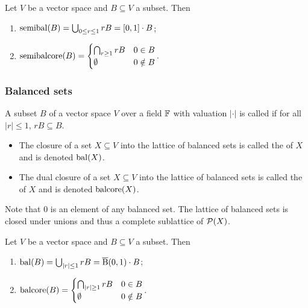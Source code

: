 \begin{lemma}
Let $V$ be a vector space and $B\subseteq V$ a subset. Then
\begin{enumerate}
\item $\semibalanced(B) = \bigcup_{0\leq r\leq 1}rB = \interval{0,1}\cdot B$;
\item $\operatorname{semibalcore}(B) = \begin{cases}
\bigcap_{r\geq 1}rB & 0\in B\\
\emptyset & 0\notin B
\end{cases}$.
\end{enumerate}
\end{lemma}

\subsubsection{Balanced sets}
\begin{definition}
A subset $B$ of a vector space $V$ over a field $\mathbb{F}$ with valuation $|\cdot|$ is called  if for all $|r|\leq 1$, $rB \subseteq B$.

\begin{itemize}
\item The closure of a set $X\subseteq V$ into the lattice of balanced sets is called the  of $X$ and is denoted $\operatorname{bal}(X)$.
\item The dual closure of a set $X\subseteq V$ into the lattice of balanced sets is called the  of $X$ and is denoted $\operatorname{balcore}(X)$.
\end{itemize}
\end{definition}
Note that $0$ is an element of any balanced set. The lattice of balanced sets is closed under unions and thus a complete sublattice of $\operatorname{\mathcal{P}}(X)$.

\begin{lemma}
Let $V$ be a vector space and $B\subseteq V$ a subset. Then
\begin{enumerate}
\item $\operatorname{bal}(B) = \bigcup_{|r|\leq 1}rB = \operatorname{\overline{B}}(0,1)\cdot B$;
\item $\operatorname{balcore}(B) = \begin{cases}
\bigcap_{|r|\geq 1}rB & 0\in B\\
\emptyset & 0\notin B
\end{cases}$.
\end{enumerate}
\end{lemma}

